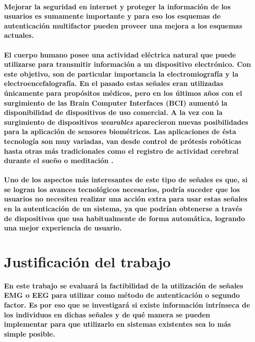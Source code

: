 \documentclass{article}
\begin{document}
\paragraph{
Mejorar la seguridad en internet y proteger la información de los usuarios es sumamente importante y para eso los esquemas de autenticación multifactor pueden proveer una mejora a los esquemas actuales.
}
\paragraph{
El cuerpo humano posee una actividad eléctrica natural que puede utilizarse para transmitir información a un dispositivo electrónico. Con este objetivo, son de particular importancia la electromiografía y la electroencefalografía. En el pasado estas señales eran utilizadas únicamente para propósitos médicos, pero en los últimos años con el surgimiento de las Brain Computer Interfaces (BCI) aumentó la disponibilidad de dispositivos de uso comercial. A la vez con la surgimiento de dispositivos \textit{wearables} aparecieron nuevas posibilidades para la aplicación de sensores biométricos. Las aplicaciones de ésta tecnología son muy variadas, van desde control de prótesis robóticas \cite{veer2015} hasta otras más tradicionales como el registro de actividad cerebral durante el sueño o meditación \cite{kaur2015}.
}
\paragraph{
Uno de los aspectos más interesantes de este tipo de señales es que, si se logran los avances tecnológicos necesarios, podría suceder que los usuarios no necesiten realizar una acción extra para usar estas señales en la autenticación de un sistema, ya que podrían obtenerse a través de dispositivos que usa habitualmente de forma automática, logrando una mejor experiencia de usuario.
}
\section{Justificación del trabajo}
\paragraph{
En este trabajo se evaluará la factibilidad de la utilización de señales EMG o EEG para utilizar como método de autenticación o segundo factor. Es por eso que se investigará si existe información intrínseca de los individuos en dichas señales y de qué manera se pueden implementar para que utilizarlo en sistemas existentes sea lo más simple posible.
}
\end{document}

